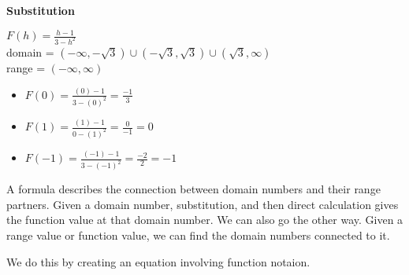 \documentclass{ximera}
\begin{document}
\begin{procedure}   \textbf{\textcolor{purple!85!blue}{Substitution}}      

$F(h) = \frac{h-1}{3-h^2}$ \\
domain = $(-\infty, -\sqrt{3}) \cup (-\sqrt{3}, \sqrt{3}) \cup (\sqrt{3}, \infty)$ \\
range = $(-\infty, \infty)$


\begin{itemize}
\item $F(0) = \frac{(0) - 1}{3 - (0)^2} = \frac{-1}{3}$
\item $F(1) = \frac{(1) - 1}{0 - (1)^2} = \frac{0}{-1} = 0$
\item $F(-1) = \frac{(-1) - 1}{3 - (-1)^2} = \frac{-2}{2} = -1$
\end{itemize}

\end{procedure}



A formula describes the connection between domain numbers and their range partners.  Given a domain number, substitution, and then direct calculation gives the function value at that domain number.  We can also go the other way.  Given a range value or function value, we can find the domain numbers connected to it.

We do this by creating an equation involving function notaion.
\end{document}
